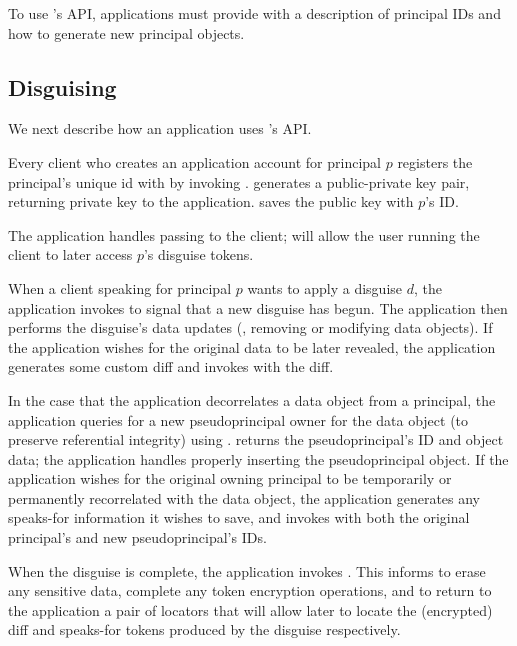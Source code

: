 To use \sys's API, applications must provide \sys with a description of principal IDs and how to
generate new principal objects.

\subsection{Disguising}

We next describe how an application uses \sys's API.

Every client who creates an application account for principal $p$ registers the principal's unique id
with \sys by invoking . \sys generates a public-private key pair, returning private key  to the
application. \sys saves the public key  with $p$'s ID.

The application handles passing  to the client;  will allow the user running the
client to later access $p$'s disguise tokens.

When a client speaking for principal $p$ wants to apply a disguise $d$,
the application invokes  to signal \sys that a new disguise has begun.
The application then performs the disguise's data updates (\eg, removing or modifying
data objects). If the application wishes for the original data to be later revealed, the
application generates some custom diff and invokes  with the diff.

In the case that the application decorrelates a data object from a principal, the application
queries \sys for a new pseudoprincipal owner for the data object (to preserve referential integrity)
using . \sys returns the pseudoprincipal's ID and object data; the
application handles properly inserting the pseudoprincipal object.  If the application wishes for
the original owning principal to be temporarily or permanently recorrelated with the data object,
the application generates any speaks-for information it wishes to save, and invokes
 with both the original principal's and new pseudoprincipal's IDs.

When the disguise is complete, the application invokes . This informs \sys to erase
any sensitive data, complete any token encryption operations, and to return to the application a
pair of locators that will allow \sys later to locate the (encrypted) diff and speaks-for tokens
produced by the disguise respectively.

